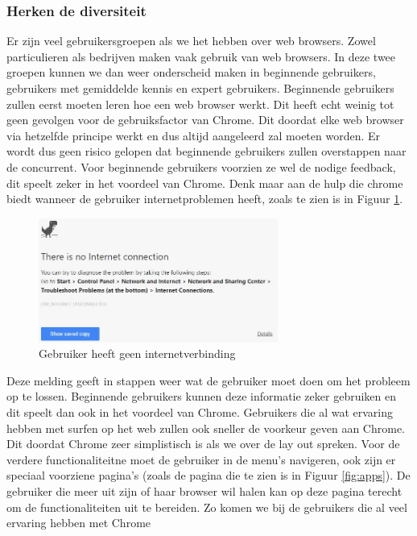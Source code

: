 \documentclass[11pt]{article}
\begin{document}
\subsubsection{Herken de diversiteit}
Er zijn veel gebruikersgroepen als we het hebben over web browsers. Zowel particulieren als bedrijven maken vaak gebruik van web browsers. In deze twee groepen kunnen we dan weer onderscheid maken in beginnende gebruikers, gebruikers met gemiddelde kennis en expert gebruikers. 
\linebreak
Beginnende gebruikers zullen eerst moeten leren hoe een web browser werkt. Dit heeft echt weinig tot geen gevolgen voor de gebruiksfactor van Chrome. Dit doordat elke web browser via hetzelfde principe werkt en dus altijd aangeleerd zal moeten worden. Er wordt dus geen risico gelopen dat beginnende gebruikers zullen overstappen naar de concurrent. Voor beginnende gebruikers voorzien ze wel de nodige feedback, dit speelt zeker in het voordeel van Chrome. Denk maar aan de hulp die chrome biedt wanneer de gebruiker internetproblemen heeft, zoals te zien is in Figuur \ref{fig:nocon}.
\begin{figure}
  \centering
    \includegraphics[width=0.7\textwidth]{NoConnection.jpg}
  \caption{Gebruiker heeft geen internetverbinding}
  \label{fig:nocon}
\end{figure}
Deze melding geeft in stappen weer wat de gebruiker moet doen om het probleem op te lossen. Beginnende gebruikers kunnen deze informatie zeker gebruiken en dit speelt dan ook in het voordeel van Chrome.
\newpage
Gebruikers die al wat ervaring hebben met surfen op het web zullen ook sneller de voorkeur geven aan Chrome. Dit doordat Chrome zeer simplistisch is als we over de lay out spreken. Voor de verdere functionaliteitne moet de gebruiker in de menu's navigeren, ook zijn er speciaal voorziene pagina's (zoals de pagina die te zien is in Figuur \ref{fig:apps}). De gebruiker die meer uit zijn of haar browser wil halen kan op deze pagina terecht om de functionaliteiten uit te bereiden. Zo komen we bij de gebruikers die al veel ervaring hebben met Chrome
\end{document}
